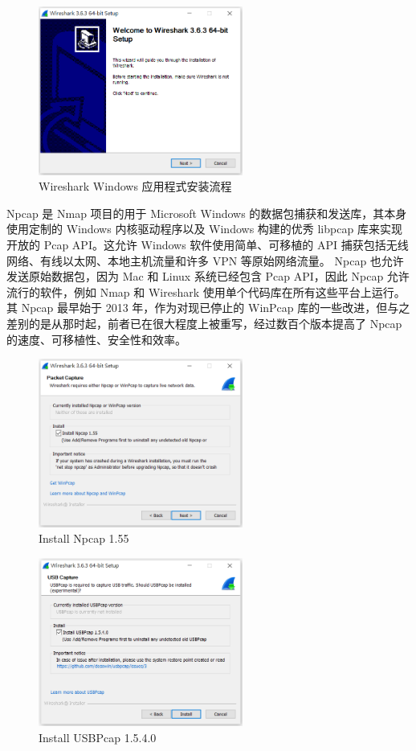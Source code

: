 \begin{figure}[htb]
\centering 
\includegraphics[width=0.60\textwidth]{img/ch1s1m2.png} 
\caption{Wireshark Windows 应用程式安装流程}
\label{Test}
\end{figure}

Npcap 是 Nmap 项目的用于 Microsoft Windows 的数据包捕获和发送库，其本身使用定制的 Windows 内核驱动程序以及 Windows 构建的优秀 libpcap 库来实现开放的 Pcap API。这允许 Windows 软件使用简单、可移植的 API 捕获包括无线网络、有线以太网、本地主机流量和许多 VPN 等原始网络流量。 Npcap 也允许发送原始数据包，因为 Mac 和 Linux 系统已经包含 Pcap API，因此 Npcap 允许流行的软件，例如 Nmap 和 Wireshark 使用单个代码库在所有这些平台上运行。其 Npcap 最早始于 2013 年，作为对现已停止的 WinPcap 库的一些改进，但与之差别的是从那时起，前者已在很大程度上被重写，经过数百个版本提高了 Npcap 的速度、可移植性、安全性和效率。

\begin{figure}[htb]
\centering 
\includegraphics[width=0.60\textwidth]{img/ch1s1m3.png} 
\caption{Install Npcap 1.55}
\label{Test}
\end{figure}

\begin{figure}[htb]
\centering 
\includegraphics[width=0.60\textwidth]{img/ch1s1m4.png} 
\caption{Install USBPcap 1.5.4.0}
\label{Test}
\end{figure}

